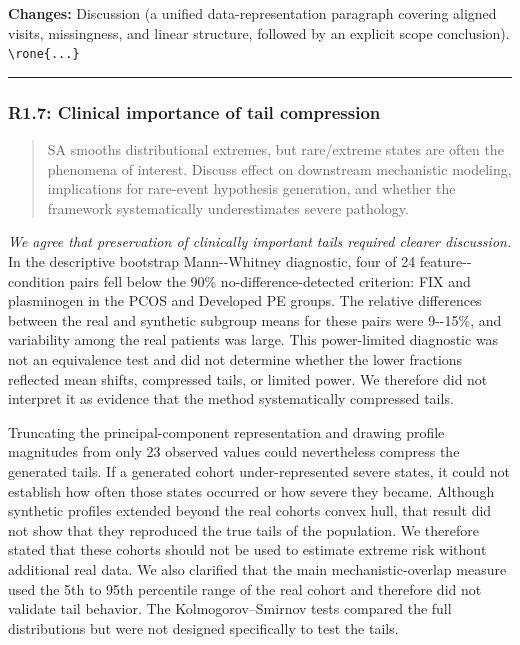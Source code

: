 \documentclass[
  11pt,
  letterpaper,
]{article}
\begin{document}
\textbf{Changes:} Discussion (a unified data-representation paragraph covering aligned visits, missingness, and linear structure, followed by an explicit scope conclusion). \texttt{\textbackslash{}rone\{...\}}

\begin{center}\rule{0.5\linewidth}{0.5pt}\end{center}

\subsubsection{R1.7: Clinical importance of tail compression}\label{r17-clinical-importance-of-tail-compression}

\begin{quote}
SA smooths distributional extremes, but rare/extreme states are often the phenomena of interest. Discuss effect on downstream mechanistic modeling, implications for rare-event hypothesis generation, and whether the framework systematically underestimates severe pathology.
\end{quote}

\emph{We agree that preservation of clinically important tails required clearer discussion.} In the descriptive bootstrap Mann-\/-Whitney diagnostic, four of 24 feature-\/-condition pairs fell below the 90\% no-difference-detected criterion: FIX and plasminogen in the PCOS and Developed PE groups. The relative differences between the real and synthetic subgroup means for these pairs were 9-\/-15\%, and variability among the real patients was large. This power-limited diagnostic was not an equivalence test and did not determine whether the lower fractions reflected mean shifts, compressed tails, or limited power. We therefore did not interpret it as evidence that the method systematically compressed tails.

Truncating the principal-component representation and drawing profile magnitudes from only 23 observed values could nevertheless compress the generated tails. If a generated cohort under-represented severe states, it could not establish how often those states occurred or how severe they became. Although synthetic profiles extended beyond the real cohort\textquotesingle s convex hull, that result did not show that they reproduced the true tails of the population. We therefore stated that these cohorts should not be used to estimate extreme risk without additional real data. We also clarified that the main mechanistic-overlap measure used the 5th to 95th percentile range of the real cohort and therefore did not validate tail behavior. The Kolmogorov--Smirnov tests compared the full distributions but were not designed specifically to test the tails.
\end{document}
